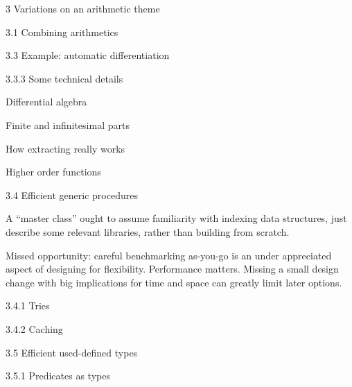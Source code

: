 \documentclass[12pt]{PalisadesLakesBook}
\begin{document}
\begin{plSection}{3 Variations on an arithmetic theme}
\begin{plSection}{3.1 Combining arithmetics}
\begin{plSection}{3.3 Example: automatic differentiation}
\begin{plSection}{3.3.3 Some technical details}
\begin{plSection}{Differential algebra}
\end{plSection}%
\begin{plSection}{Finite and infinitesimal parts}
\end{plSection}%
\begin{plSection}{How extracting really works}
\end{plSection}%
\begin{plSection}{Higher order functions}
\end{plSection}%
\end{plSection}%
\end{plSection}%
\begin{plSection}{3.4 Efficient generic procedures}

A ``master class'' ought to assume familiarity with
indexing data structures, just describe some relevant 
libraries, rather than building from scratch.

Missed opportunity: careful benchmarking as-you-go
is an under appreciated aspect of designing for flexibility.
Performance matters. 
Missing a small design change with big
implications for time and space can greatly limit later options.

\begin{plSection}{3.4.1 Tries}
\end{plSection}%
\begin{plSection}{3.4.2 Caching}
\end{plSection}%
\end{plSection}%
\begin{plSection}{3.5 Efficient used-defined types}
\begin{plSection}{3.5.1 Predicates as types}


\end{plSection}
\end{plSection}
\end{plSection}
\end{plSection}
\end{document}
